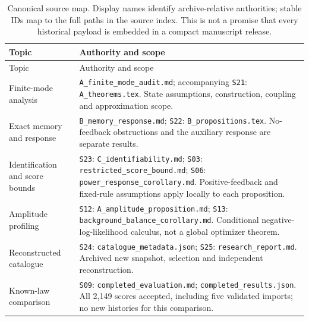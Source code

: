 \begin{longtable}{@{}>{\raggedright\arraybackslash}p{}>{\raggedright\arraybackslash}p{}@{}}
\caption{Canonical source map. Display names identify archive-relative authorities; stable IDs map to the full paths in the source index. This is not a promise that every historical payload is embedded in a compact manuscript release.}\label{tab:authority_map}\\
\toprule
Topic & Authority and scope \\
\midrule
\endfirsthead
\toprule Topic & Authority and scope \\\midrule
\endhead
Finite-mode analysis & \nolinkurl{A_finite_mode_audit.md}; accompanying \texttt{S21}: \nolinkurl{A_theorems.tex}. State assumptions, construction, coupling and approximation scope. \\
Exact memory and response & \nolinkurl{B_memory_response.md}; \texttt{S22}: \nolinkurl{B_propositions.tex}. No-feedback obstructions and the auxiliary response are separate results. \\
Identification and score bounds & \texttt{S23}: \nolinkurl{C_identifiability.md}; \texttt{S03}: \nolinkurl{restricted_score_bound.md}; \texttt{S06}: \nolinkurl{power_response_corollary.md}. Positive-feedback and fixed-rule assumptions apply locally to each proposition. \\
Amplitude profiling & \texttt{S12}: \nolinkurl{A_amplitude_proposition.md}; \texttt{S13}: \nolinkurl{background_balance_corollary.md}. Conditional negative-log-likelihood calculus, not a global optimizer theorem. \\
Reconstructed catalogue & \texttt{S24}: \nolinkurl{catalogue_metadata.json}; \texttt{S25}: \nolinkurl{research_report.md}. Archived new snapshot, selection and independent reconstruction. \\
Known-law comparison & \texttt{S09}: \nolinkurl{completed_evaluation.md}; \nolinkurl{completed_results.json}. All 2,149 scores accepted, including five validated imports; no new histories for this comparison. \\

\end{longtable}

